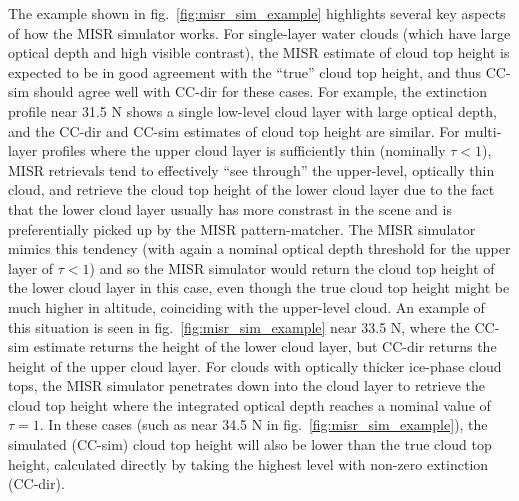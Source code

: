 The example shown in fig.~\ref{fig:misr_sim_example} highlights several
key aspects of how the MISR simulator works. For single-layer water
clouds (which have large optical depth and high visible contrast), the
MISR estimate of cloud top height is expected to be in good agreement
with the ``true'' cloud top height, and thus CC-sim should agree well
with CC-dir for these cases. For example, the extinction profile near
31.5 N shows a single low-level cloud layer with large optical depth,
and the CC-dir and CC-sim estimates of cloud top height are similar. For
multi-layer profiles where the upper cloud layer is sufficiently thin
(nominally \(\tau < 1\)), MISR retrievals tend to effectively ``see
through'' the upper-level, optically thin cloud, and retrieve the cloud
top height of the lower cloud layer due to the fact that the lower cloud
layer usually has more constrast in the scene and is preferentially
picked up by the MISR pattern-matcher. The MISR simulator mimics this
tendency (with again a nominal optical depth threshold for the upper
layer of \(\tau < 1\)) and so the MISR simulator would return the cloud
top height of the lower cloud layer in this case, even though the true
cloud top height might be much higher in altitude, coinciding with the
upper-level cloud. An example of this situation is seen in
fig.~\ref{fig:misr_sim_example} near 33.5 N, where the CC-sim estimate
returns the height of the lower cloud layer, but CC-dir returns the
height of the upper cloud layer. For clouds with optically thicker
ice-phase cloud tops, the MISR simulator penetrates down into the cloud
layer to retrieve the cloud top height where the integrated optical
depth reaches a nominal value of \(\tau = 1\). In these cases (such as
near 34.5 N in fig.~\ref{fig:misr_sim_example}), the simulated (CC-sim)
cloud top height will also be lower than the true cloud top height,
calculated directly by taking the highest level with non-zero extinction
(CC-dir).

